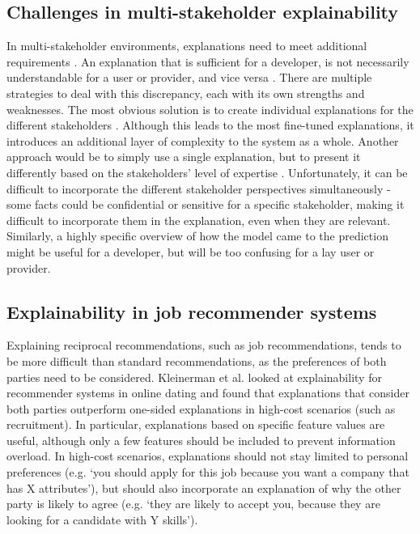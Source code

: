 \subsection{Challenges in multi-stakeholder explainability}
In multi-stakeholder environments, explanations need to meet additional requirements \cite{abdollahpouri2020multistakeholder}. An explanation that is sufficient for a developer, is not necessarily understandable for a user or provider, and vice versa \cite{szymanski2021visual}. There are multiple strategies to deal with this discrepancy, each with its own strengths and weaknesses. The most obvious solution is to create individual explanations for the different stakeholders \cite{yildirim2021bideepfm}. Although this leads to the most fine-tuned explanations, it introduces an additional layer of complexity to the system as a whole. Another approach would be to simply use a single explanation, but to present it differently based on the stakeholders' level of expertise \cite{abdollahpouri2020multistakeholder}. Unfortunately, it can be difficult to incorporate the different stakeholder perspectives simultaneously - some facts could be confidential or sensitive for a specific stakeholder, making it difficult to incorporate them in the explanation, even when they are relevant. Similarly, a highly specific overview of how the model came to the prediction might be useful for a developer, but will be too confusing for a lay user or provider. 

\subsection{Explainability in job recommender systems}
Explaining reciprocal recommendations, such as job recommendations, tends to be more difficult than standard recommendations, as the preferences of both parties need to be considered. Kleinerman et al. \cite{kleinerman2018providing} looked at explainability for recommender systems in online dating and found that explanations that consider both parties outperform one-sided explanations in high-cost scenarios (such as recruitment). In particular, explanations based on specific feature values are useful, although only a few features should be included to prevent information overload. In high-cost scenarios, explanations should not stay limited to personal preferences (e.g. `you should apply for this job because you want a company that has X attributes'), but should also incorporate an explanation of why the other party is likely to agree (e.g. `they are likely to accept you, because they are looking for a candidate with Y skills'). 

